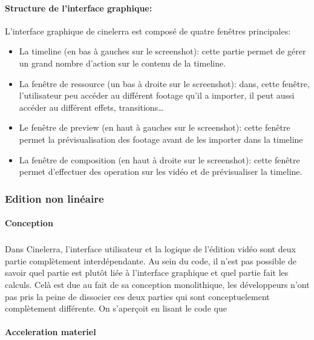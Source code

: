 \paragraph{Structure de l'interface graphique:}

L'interface graphique de cinelerra est composé de quatre fenêtres
principales:

\begin{itemize}
  \item {La timeline (en bas à gauches sur le screenshot): cette
    partie permet de gérer un grand nombre d'action sur le contenu de
    la timeline.}

  \item {La fenêtre de ressource (un bas à droite sur le screenshot):
    dans, cette fenêtre, l'utilisateur peu accéder au différent
    footage qu'il a importer, il peut aussi accéder au différent effets,
    transitions\ldots}

  \item {Le fenêtre de preview (en haut à gauches sur le screenshot):
    cette fenêtre permet la prévisualisation des footage avant de les
    importer dans la timeline}

  \item {La fenêtre de composition (en haut à droite sur le screenshot):
    cette fenêtre permet d'effectuer des operation sur les vidéo et
    de prévisualiser la timeline.}

\end{itemize}

\subsubsection{Edition non linéaire}

\paragraph{Conception}

\subparagraph{}

Dans Cinelerra, l'interface utilisateur et la logique de l'édition
vidéo sont deux partie complètement interdépendante. Au sein du
code, il n'est pas possible de savoir quel partie est plutôt liée à
l'interface graphique et quel partie fait les calculs. Celà est due au
fait de sa conception monolithique, les développeurs n'ont pas pris la
peine de dissocier ces deux parties qui sont conceptuelement complètement
différente. On s'aperçoit en lisant le code que

\paragraph{Acceleration materiel}

